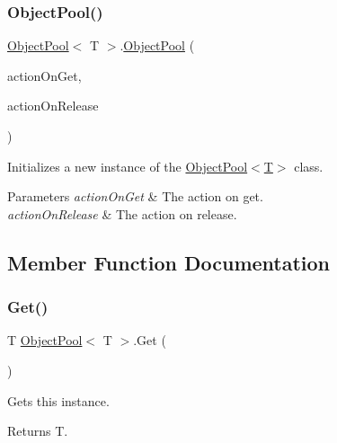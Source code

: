 \subsubsection{\texorpdfstring{Object\+Pool()}{ObjectPool()}}
{\footnotesize\ttfamily \hyperlink{class_object_pool}{Object\+Pool}$<$ T $>$.\hyperlink{class_object_pool}{Object\+Pool} (\begin{DoxyParamCaption}\item[{Unity\+Action$<$ T $>$}]{action\+On\+Get,  }\item[{Unity\+Action$<$ T $>$}]{action\+On\+Release }\end{DoxyParamCaption})\hspace{0.3cm}{\ttfamily [inline]}}



Initializes a new instance of the \hyperlink{class_object_pool_ac7f7c5e592e12b2b9d7ed59ec64a2d6d}{Object\+Pool$<$\+T$>$} class. 


\begin{DoxyParams}{Parameters}
{\em action\+On\+Get} & The action on get.\\
\hline
{\em action\+On\+Release} & The action on release.\\
\hline
\end{DoxyParams}


\subsection{Member Function Documentation}
\mbox{\label{class_object_pool_a28b7e503afcecfb7f8ae7647c7efdff8}} 
\subsubsection{\texorpdfstring{Get()}{Get()}}
{\footnotesize\ttfamily T \hyperlink{class_object_pool}{Object\+Pool}$<$ T $>$.Get (\begin{DoxyParamCaption}{ }\end{DoxyParamCaption})\hspace{0.3cm}{\ttfamily [inline]}}



Gets this instance. 

\begin{DoxyReturn}{Returns}
T.
\end{DoxyReturn}
\mbox{\label{class_object_pool_af85041dbe64efa883573f2ad8e24f852}} 
